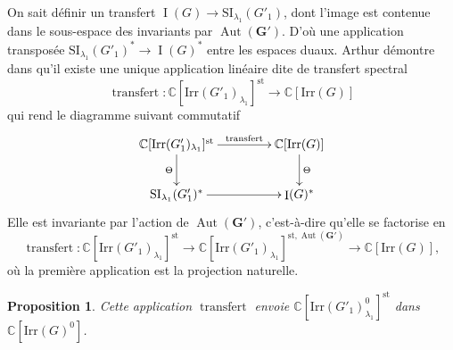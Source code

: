 \documentclass[11pt]{article}
\numberwithin{equation}{section}\providecommand{\og}{«\,}\providecommand{\fg}{\,»}
\newcommand{\Irr}{\mathrm{Irr}}
\newcommand{\SI}{\mathrm{SI}}
\newcommand{\st}{\mathrm{st}}
\DeclareMathOperator{\Aut}{Aut}
\DeclareMathOperator{\rI}{I}
\DeclareMathOperator{\transfert}{transfert}
\newcommand{\bG}{\boldsymbol{G}}
\newcommand{\CC}{\mathbb{C}}
\theoremstyle{plain}
\newtheorem*{prop*}{Proposition}
\theoremstyle{definition}
\begin{document}
On sait définir un transfert $\rI(G)\to \SI_{\lambda_{1}}(G'_{1})$, dont l'image est contenue dans le sous-espace des invariants par $\Aut(\bG')$. D'où une application transposée $ \SI_{\lambda_{1}}(G'_{1})^*\to \rI(G)^*$ entre les espaces duaux. Arthur démontre dans \cite{A3} qu'il existe
une unique application linéaire dite de transfert spectral
\[
\transfert:\CC[\Irr(G'_{1})_{\lambda_{1}}]^{\st}\to\CC[\Irr(G)]
\]
qui rend le diagramme suivant commutatif
\[
\xymatrix@C=1.5cm{
\CC[\Irr(G'_{1})_{\lambda_{1}}]^{\st}\ar[r]^-{\transfert}\ar[d]_-\Theta&\CC[\Irr(G)]\ar[d]^-\Theta\\
\SI_{\lambda_{1}}(G'_{1})^*\ar[r]& \rI(G)^*
}
\]
Elle est invariante par l'action de $\Aut(\bG')$, c'est-à-dire qu'elle se factorise en
\[
\transfert:\CC[\Irr(G'_{1})_{\lambda_{1}}]^{\st}\to\CC[\Irr(G'_{1})_{\lambda_{1}}]^{\st,\Aut(\bG')}\to\CC[\Irr(G)],
\]
où la première application est la projection naturelle.

\begin{prop*}
Cette application $\transfert$ envoie $\CC[\Irr(G'_{1})^0_{\lambda_{1}}]^{\st}$ dans $\CC[\Irr(G)^0]$.
\end{prop*}
\end{document}
